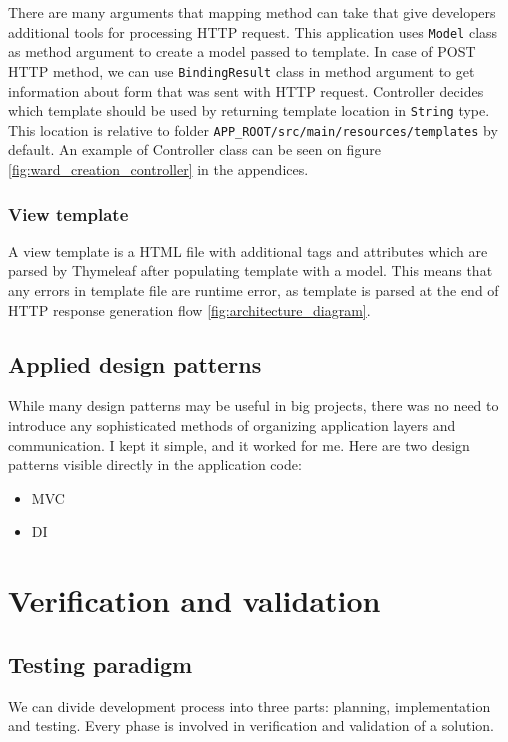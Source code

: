 \documentclass[a4paper,twoside,12pt]{book}
\begin{document}
      There are many arguments that mapping method can take that give developers additional tools for processing HTTP request.
      This application uses \lstinline|Model| class as method argument to create a model passed to template.
      In case of POST HTTP method, we can use \lstinline|BindingResult| class in method argument to get information about form that was sent with HTTP request.
      Controller decides which template should be used by returning template location in \lstinline|String| type.
      This location is relative to folder \lstinline[language=bash]|APP_ROOT/src/main/resources/templates| by default.
      An example of Controller class can be seen on figure \ref{fig:ward_creation_controller} in the appendices.

    \subsection{View template}
      A view template is a HTML file with additional tags and attributes which are parsed by Thymeleaf after populating template with a model.
      This means that any errors in template file are runtime error, as template is parsed at the end of HTTP response generation flow \ref{fig:architecture_diagram}.

  \section{Applied design patterns}
    While many design patterns may be useful in big projects, there was no need to introduce any sophisticated methods of organizing application layers and communication.
    I kept it simple, and it worked for me. Here are two design patterns visible directly in the application code:
    \begin{itemize}
      \item MVC
      \item DI
    \end{itemize}

\chapter{Verification and validation}
  \section{Testing paradigm}
    We can divide development process into three parts: planning, implementation and testing. Every phase is involved in verification and validation of a solution.
\end{document}
